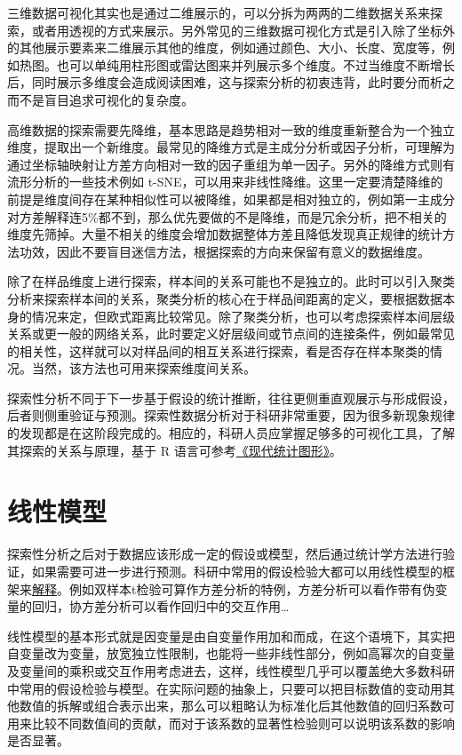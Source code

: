 \documentclass[]{tufte-book}
\begin{document}
三维数据可视化其实也是通过二维展示的，可以分拆为两两的二维数据关系来探索，或者用透视的方式来展示。另外常见的三维数据可视化方式是引入除了坐标外的其他展示要素来二维展示其他的维度，例如通过颜色、大小、长度、宽度等，例如热图。也可以单纯用柱形图或雷达图来并列展示多个维度。不过当维度不断增长后，同时展示多维度会造成阅读困难，这与探索分析的初衷违背，此时要分而析之而不是盲目追求可视化的复杂度。

高维数据的探索需要先降维，基本思路是趋势相对一致的维度重新整合为一个独立维度，提取出一个新维度。最常见的降维方式是主成分分析或因子分析，可理解为通过坐标轴映射让方差方向相对一致的因子重组为单一因子。另外的降维方式则有流形分析的一些技术例如 t-SNE，可以用来非线性降维。这里一定要清楚降维的前提是维度间存在某种相似性可以被降维，如果都是相对独立的，例如第一主成分对方差解释连5\%都不到，那么优先要做的不是降维，而是冗余分析，把不相关的维度先筛掉。大量不相关的维度会增加数据整体方差且降低发现真正规律的统计方法功效，因此不要盲目迷信方法，根据探索的方向来保留有意义的数据维度。

除了在样品维度上进行探索，样本间的关系可能也不是独立的。此时可以引入聚类分析来探索样本间的关系，聚类分析的核心在于样品间距离的定义，要根据数据本身的情况来定，但欧式距离比较常见。除了聚类分析，也可以考虑探索样本间层级关系或更一般的网络关系，此时要定义好层级间或节点间的连接条件，例如最常见的相关性，这样就可以对样品间的相互关系进行探索，看是否存在样本聚类的情况。当然，该方法也可用来探索维度间关系。

探索性分析不同于下一步基于假设的统计推断，往往更侧重直观展示与形成假设，后者则侧重验证与预测。探索性数据分析对于科研非常重要，因为很多新现象规律的发现都是在这阶段完成的。相应的，科研人员应掌握足够多的可视化工具，了解其探索的关系与原理，基于 R 语言可参考\href{https://bookdown.org/xiangyun/msg/}{《现代统计图形》}。

\hypertarget{ux7ebfux6027ux6a21ux578b}{%
\section{线性模型}\label{ux7ebfux6027ux6a21ux578b}}

探索性分析之后对于数据应该形成一定的假设或模型，然后通过统计学方法进行验证，如果需要可进一步进行预测。科研中常用的假设检验大都可以用线性模型的框架来\href{https://cosx.org/2019/09/common-tests-as-linear-models/}{解释}。例如双样本t检验可算作方差分析的特例，方差分析可以看作带有伪变量的回归，协方差分析可以看作回归中的交互作用\ldots{}

线性模型的基本形式就是因变量是由自变量作用加和而成，在这个语境下，其实把自变量改为变量，放宽独立性限制，也能将一些非线性部分，例如高幂次的自变量及变量间的乘积或交互作用考虑进去，这样，线性模型几乎可以覆盖绝大多数科研中常用的假设检验与模型。在实际问题的抽象上，只要可以把目标数值的变动用其他数值的拆解或组合表示出来，那么可以粗略认为标准化后其他数值的回归系数可用来比较不同数值间的贡献，而对于该系数的显著性检验则可以说明该系数的影响是否显著。
\end{document}
